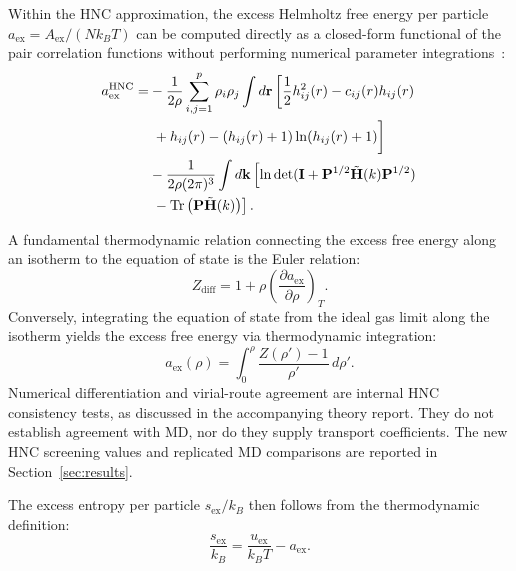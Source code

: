 \documentclass[aps,pre,twocolumn,superscriptaddress,floatfix]{revtex4-2}
\begin{document}
Within the HNC approximation, the excess Helmholtz free energy per particle $a_{\text{ex}} = A_{\text{ex}} / (N k_B T)$ can be computed directly as a closed-form functional of the pair correlation functions without performing numerical parameter integrations~\cite{Morita1960,Singer1985,Lomba1994}:
\begin{equation}
\begin{split}
a_{\text{ex}}^{\text{HNC}} = & -\frac{1}{2\rho} \sum_{i,j=1}^p \rho_i \rho_j \int d\mathbf{r} \left[ \frac{1}{2} h_{ij}^2(r) - c_{ij}(r) h_{ij}(r) \right. \\
& \left. \vphantom{\frac{1}{2}} + h_{ij}(r) - (h_{ij}(r) + 1) \ln(h_{ij}(r) + 1) \right] \\
& - \frac{1}{2\rho (2\pi)^3} \int d\mathbf{k} \left[ \ln \det(\mathbf{I} + \mathbf{P}^{1/2} \tilde{\mathbf{H}}(k) \mathbf{P}^{1/2}) \right. \\
& \left. \vphantom{\ln \det} - \text{Tr}\left(\mathbf{P} \tilde{\mathbf{H}}(k)\right) \right].
\end{split}
\label{eq:hnc_free_energy}
\end{equation}

A fundamental thermodynamic relation connecting the excess free energy along an isotherm to the equation of state is the Euler relation:
\begin{equation}
Z_{\text{diff}} = 1 + \rho \left( \frac{\partial a_{\text{ex}}}{\partial \rho} \right)_T.
\label{eq:z_diff}
\end{equation}
Conversely, integrating the equation of state from the ideal gas limit along the isotherm yields the excess free energy via thermodynamic integration:
\begin{equation}
a_{\text{ex}}(\rho) = \int_0^\rho \frac{Z(\rho') - 1}{\rho'} \, d\rho'.
\label{eq:ti_path}
\end{equation}
Numerical differentiation and virial-route agreement are internal HNC consistency tests, as discussed in the accompanying theory report. They do not establish agreement with MD, nor do they supply transport coefficients. The new HNC screening values and replicated MD comparisons are reported in Section~\ref{sec:results}.

The excess entropy per particle $s_{\text{ex}} / k_B$ then follows from the thermodynamic definition:
\begin{equation}
\frac{s_{\text{ex}}}{k_B} = \frac{u_{\text{ex}}}{k_B T} - a_{\text{ex}}.
\label{eq:sex_thermo}
\end{equation}
\end{document}
